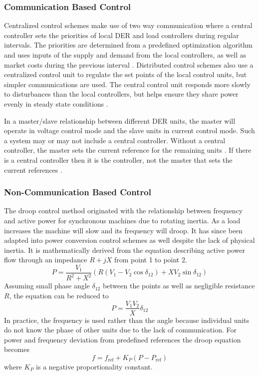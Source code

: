 \subsubsection{Communication Based Control}
Centralized control schemes make use of two way communication where a central controller sets the priorities of local DER and load controllers during regular intervals. The priorities are determined from a predefined optimization algorithm and uses inputs of the supply and demand from the local controllers, as well as market costs during the previous interval \cite{Katiraei2008}. Distributed control schemes also use a centralized control unit to regulate the set points of the local control units, but simpler communications are used. The central control unit responds more slowly to disturbances than the local controllers, but helps ensure they share power evenly in steady state conditions \cite{Prodanovic2006}. 

In a master/slave relationship between different DER units, the master will operate in voltage control mode and the slave units in current control mode. Such a system may or may not include a central controller. Without a central controller, the master sets the current reference for the remaining units \cite{Siri1992}. If there is a central controller then it is the controller, not the master that sets the current references \cite{Chen1995}.

\subsubsection{Non-Communication Based Control}
The droop control method originated with the relationship between frequency and active power for synchronous machines due to rotating inertia. As a load increases the machine will slow and its frequency will droop. It has since been adapted into power conversion control schemes as well despite the lack of physical inertia. It is mathematically derived from the equation describing active power flow through an impedance $ R + jX $ from point 1 to point 2.
\begin{equation}
P = \frac{V_{1}}{R^2 + X^2} \left( R \left( V_{1}-V_{2}\cos{\delta_{12}} \right) +X V_{2} \sin{\delta_{12}} \right)
\end{equation}
Assuming small phase angle $\delta_{12}$ between the points as well as negligible resistance $R$, the equation can be reduced to 
\begin{equation}
P = \frac{V_1V_2}{X}\delta_{12}
\end{equation}
In practice, the frequency is used rather than the angle because individual units do not know the phase of other units due to the lack of communication. For power and frequency deviation from predefined references the droop equation becomes
\begin{equation}
f = f_{\text{ref}} + K_P\left(P - P_{\text{ref}}\right)
\end{equation}
where $K_P$ is a negative proportionality constant.


